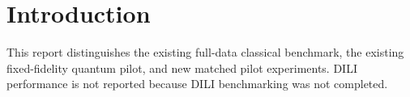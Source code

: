 \section{Introduction}
This report distinguishes the existing full-data classical benchmark, the existing
fixed-fidelity quantum pilot, and new matched pilot experiments. DILI performance
is not reported because DILI benchmarking was not completed.
